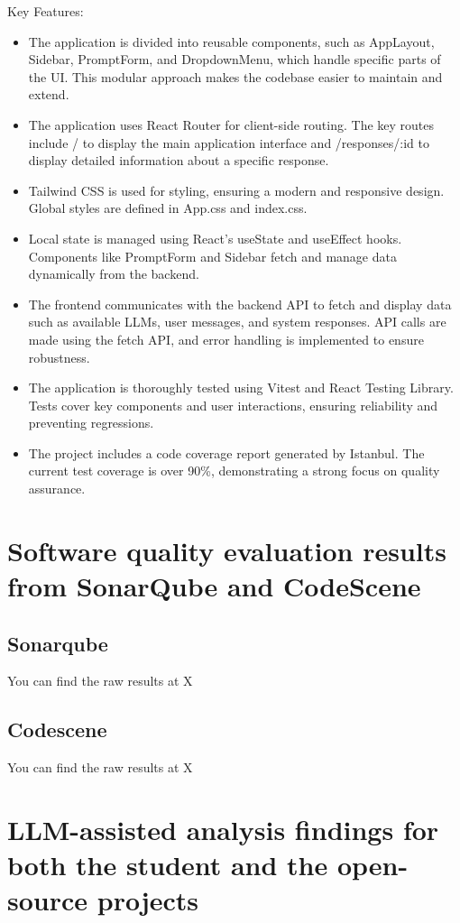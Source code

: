\documentclass[sigconf]{acmart}
\begin{document}
Key Features:
\begin{itemize}
\item The application is divided into reusable components, such as AppLayout, Sidebar, PromptForm, and DropdownMenu, which handle specific parts of the UI. This modular approach makes the codebase easier to maintain and extend.
\item The application uses React Router for client-side routing. The key routes include / to display the main application interface and /responses/:id to display detailed information about a specific response.
\item Tailwind CSS is used for styling, ensuring a modern and responsive design. Global styles are defined in App.css and index.css.
\item Local state is managed using React's useState and useEffect hooks. Components like PromptForm and Sidebar fetch and manage data dynamically from the backend.
\item The frontend communicates with the backend API to fetch and display data such as available LLMs, user messages, and system responses. API calls are made using the fetch API, and error handling is implemented to ensure robustness.
\item The application is thoroughly tested using Vitest and React Testing Library. Tests cover key components and user interactions, ensuring reliability and preventing regressions.
\item The project includes a code coverage report generated by Istanbul. The current test coverage is over 90\%, demonstrating a strong focus on quality assurance.
\end{itemize}

\section{Software quality evaluation results from SonarQube and CodeScene}
\subsection{Sonarqube}
You can find the raw results at X

\subsection{Codescene}
You can find the raw results at X

\section{LLM-assisted analysis findings for both the student and the open-source projects}
\end{document}
